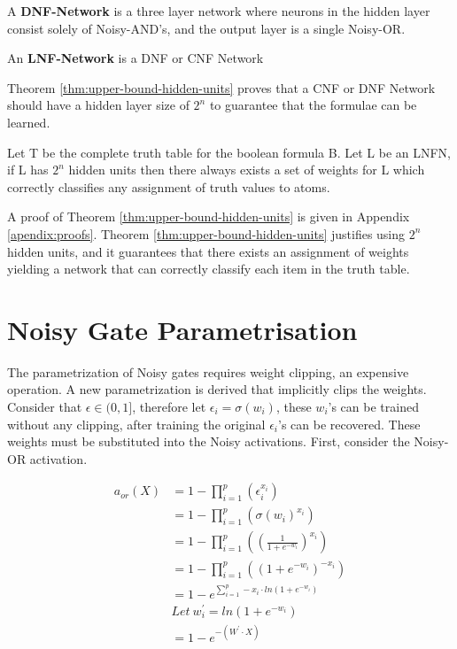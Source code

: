 \theoremstyle{definition}
\begin{definition} \label{def:dnf-network}
A \textbf{DNF-Network} is a three layer network where neurons in the hidden layer consist solely of Noisy-AND's, and the output layer is a single Noisy-OR. 
\end{definition}

\theoremstyle{definition}
\begin{definition} \label{def:lnfn}
An \textbf{LNF-Network} is a DNF or CNF Network
\end{definition}

Theorem \ref{thm:upper-bound-hidden-units} proves that a CNF or DNF Network should have a hidden layer size of $2^n$ to guarantee that the formulae can be learned.

\begin{theorem}
Let T be the complete truth table for the boolean formula B. Let L be an LNFN, if L has $2^n$ hidden units then there always exists a set of weights for L which correctly classifies any assignment of truth values to atoms.
\label{thm:upper-bound-hidden-units}
\end{theorem}

A proof of Theorem \ref{thm:upper-bound-hidden-units} is given in Appendix \ref{apendix:proofs}. Theorem \ref{thm:upper-bound-hidden-units} justifies using $2^n$ hidden units, and it guarantees that there exists an assignment of weights yielding a network that can correctly classify each item in the truth table.

\section{Noisy Gate Parametrisation} \label{sec:real-noisy-parametrisation}
The parametrization of Noisy gates requires weight clipping, an expensive operation. A new parametrization is derived that implicitly clips the weights. Consider that $\epsilon \in (0, 1]$, therefore let $\epsilon_i = \sigma(w_i)$, these $w_i$'s can be trained without any clipping, after training the original $\epsilon_i$'s can be recovered. These weights must be substituted into the Noisy activations. First, consider the Noisy-OR activation.

\begin{align*}
a_{or}(X) &= 1 - \prod^p_{i=1}(\epsilon_i^{x_i})\\
&= 1 - \prod^p_{i=1}(\sigma(w_i)^{x_i})\\
&= 1 - \prod^p_{i=1}((\frac{1}{1 + e^{-w_i}})^{x_i})\\
&= 1 - \prod^p_{i=1}((1 + e^{-w_i})^{-x_i})\\
&= 1 - e^{\sum^p_{i=1} -x_i \cdot ln(1 + e^{-w_i})} \\
&Let\ w_i^{'} = ln(1 + e^{-w_i})\\
&= 1 - e^{-(W^{'} \cdot X)}
\end{align*}

